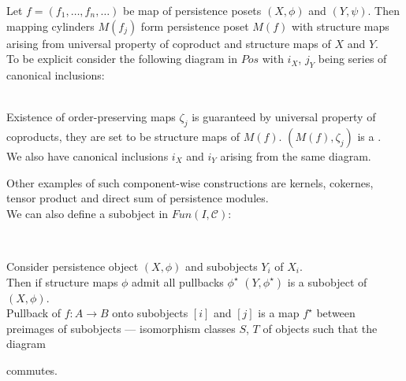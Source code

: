 \begin{definition}
  Let $f = (f_1,\ldots,f_n,\ldots)$ be map of persistence posets $(X, \phi)$ and $(Y, \psi)$. Then mapping cylinders $M(f_j)$ form persistence poset $M(f)$ with structure maps arising from universal property of coproduct and structure maps of $X$ and $Y$.\\

  To be explicit consider the following diagram in $Pos$ with $i_X$, $j_Y$ being series of canonical inclusions:\\
  \\

  Existence of order-preserving maps $\zeta_j$ is guaranteed by universal property of coproducts, they are set to be structure maps of $M(f)$. $(M(f), \zeta_j)$ is a .\\

  We also have canonical inclusions $i_X$ and $i_Y$ arising from the same diagram.
\end{definition}

Other examples of such component-wise constructions are kernels, cokernes, tensor product and direct sum of persistence modules.\\

We can also define a subobject in $Fun(I, \mathcal{C})$:

\begin{definition} ~ \par
  Consider persistence object $(X,\phi)$ and subobjects $Y_i$ of $X_i$.\\

  Then if structure maps $\phi$ admit all pullbacks $\phi^{\star}$ $(Y,\phi^{\star})$ is a subobject of $(X, \phi)$.\\

  Pullback of $f : A \to B$ onto subobjects $[i]$ and $[j]$ is a map $f^{\star}$ between preimages of subobjects --- isomorphism classes $S$, $T$ of objects such that the diagram\\
  commutes.
\end{definition}


